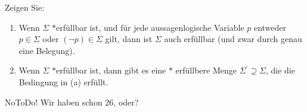 
\begin{exercise}[27]

Zeigen Sie:

\begin{enumerate}
    \item Wenn $\Sigma$ $\ast$erfüllbar ist, und für jede aussagenlogische Variable $p$ entweder $p \in \Sigma$ oder $(\neg p) \in \Sigma$ gilt, dann ist $\Sigma$ auch erfüllbar (und zwar durch genau eine Belegung).
    \item Wenn $\Sigma$ $\ast$erfüllbar ist, dann gibt es eine $\ast$ erfüllbere Menge $\Sigma^\prime \supseteq \Sigma$, die die Bedingung in (a) erfüllt.
\end{enumerate}

\end{exercise}


\begin{solution}

NoToDo!
Wir haben schon 26, oder?

\end{solution}

